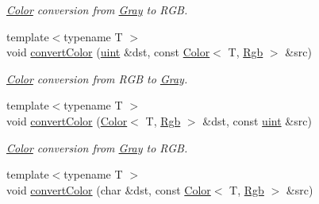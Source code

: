 \begin{DoxyCompactItemize}
\begin{DoxyCompactList}\small\item\em \hyperlink{class_d_o_1_1_color}{Color} conversion from \hyperlink{struct_d_o_1_1_gray}{Gray} to R\-G\-B. \end{DoxyCompactList}\item 
\hypertarget{group___color_conversion_ga9bc400410f4ce0c92b283158b49f0deb}{{\footnotesize template$<$typename T $>$ }\\void \hyperlink{group___color_conversion_ga9bc400410f4ce0c92b283158b49f0deb}{convert\-Color} (\hyperlink{group___eigen_typedefs_ga91ad9478d81a7aaf2593e8d9c3d06a14}{uint} \&dst, const \hyperlink{class_d_o_1_1_color}{Color}$<$ T, \hyperlink{group___color_space_gaad92fea51e98e11252ac86f2c8665d13}{Rgb} $>$ \&src)}\label{group___color_conversion_ga9bc400410f4ce0c92b283158b49f0deb}

\begin{DoxyCompactList}\small\item\em \hyperlink{class_d_o_1_1_color}{Color} conversion from R\-G\-B to \hyperlink{struct_d_o_1_1_gray}{Gray}. \end{DoxyCompactList}\item 
\hypertarget{group___color_conversion_ga1b0388fd6e73f47cd74f29fd57a3547b}{{\footnotesize template$<$typename T $>$ }\\void \hyperlink{group___color_conversion_ga1b0388fd6e73f47cd74f29fd57a3547b}{convert\-Color} (\hyperlink{class_d_o_1_1_color}{Color}$<$ T, \hyperlink{group___color_space_gaad92fea51e98e11252ac86f2c8665d13}{Rgb} $>$ \&dst, const \hyperlink{group___eigen_typedefs_ga91ad9478d81a7aaf2593e8d9c3d06a14}{uint} \&src)}\label{group___color_conversion_ga1b0388fd6e73f47cd74f29fd57a3547b}

\begin{DoxyCompactList}\small\item\em \hyperlink{class_d_o_1_1_color}{Color} conversion from \hyperlink{struct_d_o_1_1_gray}{Gray} to R\-G\-B. \end{DoxyCompactList}\item 
\hypertarget{group___color_conversion_ga041e47dda16f0e33819de35b60fdff22}{{\footnotesize template$<$typename T $>$ }\\void \hyperlink{group___color_conversion_ga041e47dda16f0e33819de35b60fdff22}{convert\-Color} (char \&dst, const \hyperlink{class_d_o_1_1_color}{Color}$<$ T, \hyperlink{group___color_space_gaad92fea51e98e11252ac86f2c8665d13}{Rgb} $>$ \&src)}\label{group___color_conversion_ga041e47dda16f0e33819de35b60fdff22}


\end{DoxyCompactItemize}

